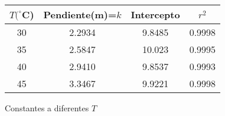 \begin{figure}[H]
    \centering
    \begin{tabular}{cccc}
    \hline
    $ T (^{\circ}$C) & Pendiente(m)=$k$  & Intercepto & $r^{2}$ \\
    \hline
    30 & 2.2934 & 9.8485   & 0.9998  \\
    35 & 2.5847 & 10.023   & 0.9995   \\
    40 & 2.9410 & 9.8537   & 0.9993   \\
    45 & 3.3467 & 9.9221   & 0.9998   \\
    \hline

    \end{tabular} 
\caption{Constantes a diferentes $T$}
    \label{fig:my_label}
\end{figure}\\